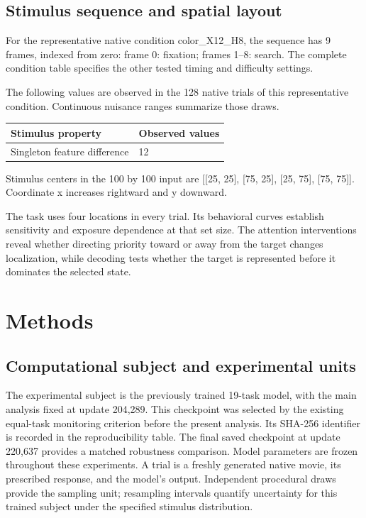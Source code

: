 \documentclass[11pt]{article}
\begin{document}
\subsection{Stimulus sequence and spatial layout}
For the representative native condition color\_\allowbreak{}X12\_\allowbreak{}H8, the sequence has 9 frames, indexed from zero: frame 0: fixation; frames 1--8: search. The complete condition table specifies the other tested timing and difficulty settings.

The following values are observed in the 128 native trials of this representative condition. Continuous nuisance ranges summarize those draws.
\begin{center}\small\begin{tabular}{p{}p{}}\toprule Stimulus property & Observed values\\\midrule
Singleton feature difference & 12\\
\bottomrule\end{tabular}\normalsize\end{center}
Stimulus centers in the 100 by 100 input are [[25, 25], [75, 25], [25, 75], [75, 75]]. Coordinate x increases rightward and y downward.

The task uses four locations in every trial. Its behavioral curves establish sensitivity and exposure dependence at that set size. The attention interventions reveal whether directing priority toward or away from the target changes localization, while decoding tests whether the target is represented before it dominates the selected state.


\section{Methods}
\subsection{Computational subject and experimental units}
The experimental subject is the previously trained 19-task model, with the main analysis fixed at update 204,289. This checkpoint was selected by the existing equal-task monitoring criterion before the present analysis. Its SHA-256 identifier is recorded in the reproducibility table. The final saved checkpoint at update 220,637 provides a matched robustness comparison. Model parameters are frozen throughout these experiments. A trial is a freshly generated native movie, its prescribed response, and the model's output. Independent procedural draws provide the sampling unit; resampling intervals quantify uncertainty for this trained subject under the specified stimulus distribution.
\end{document}
